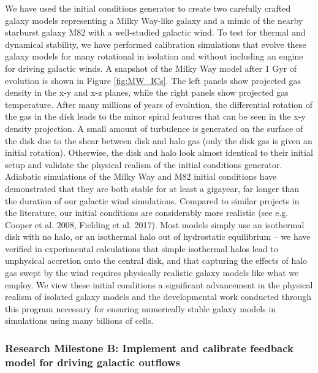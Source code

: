 \documentclass[11pt,letterpaper,english]{article}
\begin{document}
We have used the initial conditions generator to create two carefully crafted galaxy models representing
a Milky Way-like galaxy and a mimic of the nearby starburst galaxy M82 with a well-studied galactic wind.
To test for thermal and dynamical stability, we have performed calibration simulations that
evolve these galaxy models for many rotational in isolation and without including
an engine for driving galactic winds. 
A snapshot of the Milky Way model after 1 Gyr of evolution is shown in Figure \ref{fig:MW_ICs}. The left panels show projected gas density in the x-y and x-z planes, while the right panels show projected gas temperature. After many millions of years of evolution, the differential rotation of the gas in the disk leads to the minor spiral features that can be seen in the x-y density projection. A small amount of turbulence is generated on the surface of the disk due to the shear between disk and halo gas (only the disk gas is given an initial rotation). Otherwise, the disk and halo look almost identical to their initial setup and validate the physical realism of the initial conditions generator.
Adiabatic simulations of the Milky Way and M82 initial conditions have demonstrated that they are both stable for at least a gigayear, far longer than the duration of our galactic wind simulations. Compared to similar projects in the literature, our initial conditions are considerably more realistic (see e.g. Cooper et al. 2008, Fielding et al. 2017). Most models simply use an isothermal disk with no halo, or an isothermal halo out of hydrostatic equilibrium -- we have verified in experimental calculations that
simple isothermal halos lead to unphysical accretion onto the central disk, and that capturing the effects
of halo gas swept by the wind requires physically realistic galaxy models like what we employ. We view these
initial conditions a significant advancement in the physical realism of isolated galaxy models and the
developmental work conducted through this program necessary for ensuring numerically stable galaxy
models in simulations using many billions of cells.

\subsubsection{Research Milestone B: Implement and calibrate feedback model for driving galactic outflows}
\end{document}
